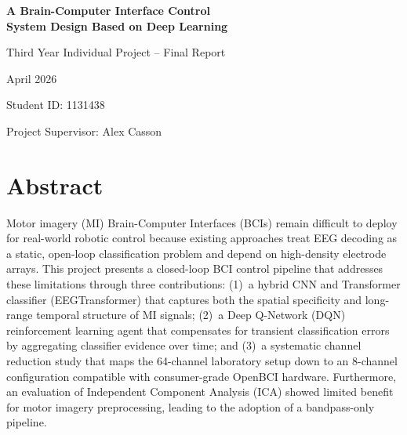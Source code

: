 \documentclass[12pt, a4paper]{article}
\begin{document}
\raggedright

\begin{titlepage}
    \centering
    \vspace*{3cm}
    {\LARGE \textbf{A Brain-Computer Interface Control \\ System Design Based on Deep Learning}\par}
    \vspace{1.5cm}
    {\Large Third Year Individual Project -- Final Report\par}
    \vspace{2.5cm}
    {\large April 2026\par}
    \vspace{2cm}
    {\large Student ID: 1131438\par}
    \vfill
    {\large Project Supervisor: Alex Casson\par}
\end{titlepage}

\setcounter{page}{2}

\begin{singlespace}
\tableofcontents
\end{singlespace}
\clearpage

\section*{Abstract}
Motor imagery (MI) Brain-Computer Interfaces (BCIs) remain difficult to deploy for real-world robotic control because existing approaches treat EEG decoding as a static, open-loop classification problem and depend on high-density electrode arrays. This project presents a closed-loop BCI control pipeline that addresses these limitations through three contributions: (1)~a hybrid CNN and Transformer classifier (EEGTransformer) that captures both the spatial specificity and long-range temporal structure of MI signals; (2)~a Deep Q-Network (DQN) reinforcement learning agent that compensates for transient classification errors by aggregating classifier evidence over time; and (3)~a systematic channel reduction study that maps the 64-channel laboratory setup down to an 8-channel configuration compatible with consumer-grade OpenBCI hardware. Furthermore, an evaluation of Independent Component Analysis (ICA) showed limited benefit for motor imagery preprocessing, leading to the adoption of a bandpass-only pipeline.
\end{document}
